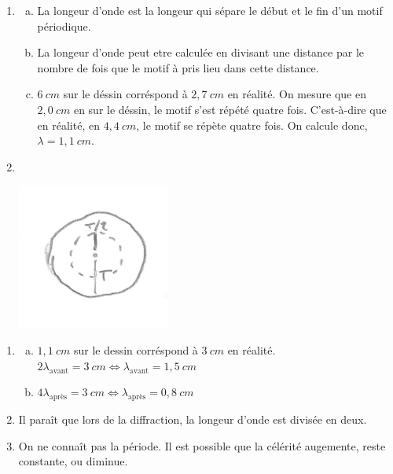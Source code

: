 \documentclass[12pt, a4paper]{article}
\begin{document}
    \begin{Exercise}[number={30}]
        \begin{enumerate}[1.]
            \item   \begin{enumerate}[a.]
                        \item La longeur d'onde est la longeur qui sépare le début et le fin d'un motif périodique.
                        \item La longeur d'onde peut etre calculée en divisant une distance par le nombre de fois que le motif à pris lieu dans cette distance.
                        \item $6\ \si{cm}$ sur le déssin corréspond à $2{,}7\ \si{cm}$ en réalité. On mesure que en $2{,}0\ \si{cm}$ en sur le déssin, le motif s'est répété quatre fois. C'est-à-dire que en réalité, en $4{,}4\ \si{cm}$, le motif se répète quatre fois. On calcule donc, $\lambda=1{,}1\ \si{cm}$.
                    \end{enumerate}
            \item \ \\\parbox{\linewidth}{
                        \centering
                        \includegraphics[width=5cm]{EX30img1.jpg}
                    } \bigbreak
        \end{enumerate}
    \end{Exercise}

    \begin{Exercise}[number={32}]
        \begin{enumerate}[1.]
            \item   \begin{enumerate}[a.]
                \item $1{,}1\ \si{cm}$ sur le dessin corréspond à $3\ \si{cm}$ en réalité. \\ $2\lambda_\text{avant}=3\ \si{cm} \iff \lambda_\text{avant}=1{,}5\ \si{cm}$
                \item $4\lambda_\text{après}=3\ \si{cm} \iff \lambda_\text{après}=0{,}8\ \si{cm}$
            \end{enumerate}
            \item Il paraît que lors de la diffraction, la longeur d'onde est divisée en deux.
            \item On ne connaît pas la période. Il est possible que la célérité augemente, reste constante, ou diminue.
        \end{enumerate}
    \end{Exercise}
\end{document}
